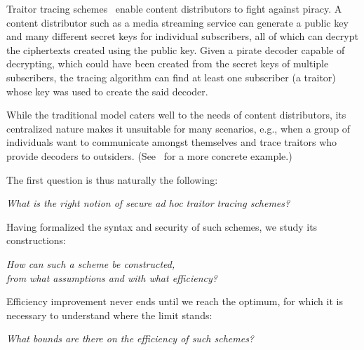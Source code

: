Traitor tracing schemes~\cite{C:ChoFiaNao94} enable content distributors to fight against piracy.
A content distributor such as a media streaming service can generate a public key and many different secret keys for individual subscribers,
all of which can decrypt the ciphertexts created using the public key.
Given a pirate decoder capable of decrypting,
which could have been created from the secret keys of multiple subscribers,
the tracing algorithm can find at least one subscriber (a traitor) whose key was used to create the said decoder.

While the traditional model caters well to the needs of content distributors,
its centralized nature makes it unsuitable for many scenarios,
e.g., when a group of individuals want to communicate amongst themselves and trace traitors who provide decoders to outsiders. (See~\cite{C:Zhandry21} for a more concrete example.)

The first question is thus naturally the following:
\begin{center}
\itshape
What is the right notion of secure ad hoc traitor tracing schemes?\\
\end{center}
Having formalized the syntax and security of such schemes,
we study its constructions:
\begin{center}
\itshape
How can such a scheme be constructed,\\
from what assumptions and with what efficiency?
\end{center}
Efficiency improvement never ends until we reach the optimum,
for which it is necessary to understand where the limit stands:
\begin{center}
\itshape
What bounds are there on the efficiency of such schemes?
\end{center}
